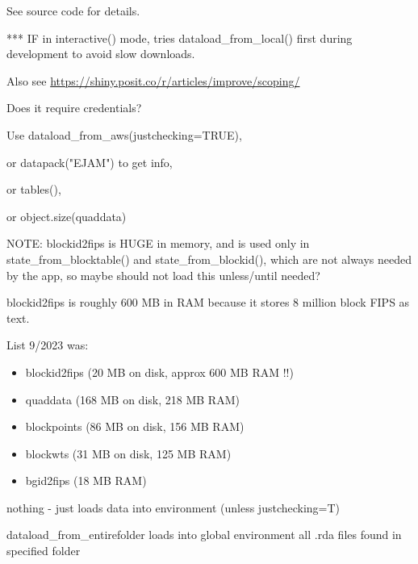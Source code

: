 \documentclass[a4paper]{book}
\begin{document}
\begin{Details}\relax
See source code for details.

*** IF in interactive() mode, tries dataload\_from\_local() first
during development to avoid slow downloads.

Also see \url{https://shiny.posit.co/r/articles/improve/scoping/}

Does it require credentials?

Use dataload\_from\_aws(justchecking=TRUE),

or datapack("EJAM") to get info,

or tables(),

or object.size(quaddata)

NOTE: blockid2fips is HUGE in memory, and is used only in
state\_from\_blocktable() and state\_from\_blockid(), which are not always needed by the app,
so maybe should not load this unless/until needed?

blockid2fips is roughly 600 MB in RAM because it stores 8 million block FIPS as text.

List 9/2023 was:
\begin{itemize}

\item{} blockid2fips (20 MB on disk, approx 600 MB RAM !!)
\item{} quaddata (168 MB on disk, 218 MB RAM)
\item{} blockpoints (86 MB on disk, 156 MB RAM)
\item{} blockwts (31 MB on disk, 125 MB RAM)
\item{} bgid2fips (18 MB RAM)

\end{itemize}

\end{Details}
%
\begin{Value}
nothing - just loads data into environment (unless justchecking=T)
\end{Value}
%
\begin{SeeAlso}\relax
{}    
\end{SeeAlso}
%
\begin{Description}\relax
dataload\_from\_entirefolder
loads into global environment all .rda files found in specified folder
\end{Description}
\end{document}
